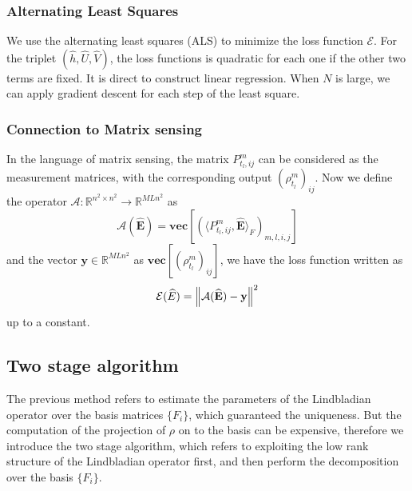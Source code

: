 \documentclass[10pt]{article}  %
\theoremstyle{plain}
\numberwithin{equation}{section}
\newcommand{\innerp}[1]{\langle{#1}\rangle}
\def\mE{\mathcal{E}}
\def\mA{\mathcal{A}}
\def\R{\mathbb{R}}
\newcommand{\bE}{\mathbf{E}}
\newcommand{\by}{\mathbf{y}}
\renewcommand{\vec}{\textbf{vec}}
\renewcommand{\R}{\mathbb{R}}
\begin{document}
\subsubsection{Alternating Least Squares}
We use the alternating least squares (ALS) to minimize the loss function $\mE$.   For the triplet $(\widehat{h}, \widehat{U}, \widehat{V})$, the loss functions is quadratic for each one if the other two terms are fixed. It is direct to construct linear regression. When $N$ is large, we can apply gradient descent for each step of the least square. 



\subsubsection{Connection to Matrix sensing}
In the language of matrix sensing, the matrix $P^m_{t_l, ij}$ can be considered as the measurement matrices, with the corresponding output $(\rho^m_{t_l})_{ij}$. Now we define the operator $\mA : \R^{n^2\times n^2}\to \R^{MLn^2}$ as
\begin{equation}
	\mA(\widehat{\bE}) = \vec\left[(\innerp{P^m_{t_l, ij}, \widehat{\bE}}_F)_{m, l, i, j}\right]
\end{equation}
and the vector $\by\in \R^{MLn^2}$ as $\vec\left[(\rho^m_{t_l})_{ij}\right]$, we have the loss function written as 
\begin{equation}
	\mE(\widehat{E}) = \norm{\mA(\widehat{\bE}) - \by}^2
\end{equation}
up to a constant. 



\subsection{Two stage algorithm}
The previous method refers to estimate the parameters of the Lindbladian operator over the basis matrices $\{F_i\}$, which guaranteed the uniqueness. But the computation of the projection of $\rho$ on to the basis can be expensive, therefore we introduce the two stage algorithm, which refers to exploiting the low rank structure of the Lindbladian operator first, and then perform the decomposition over the basis $\{F_i\}$. 
\end{document}
